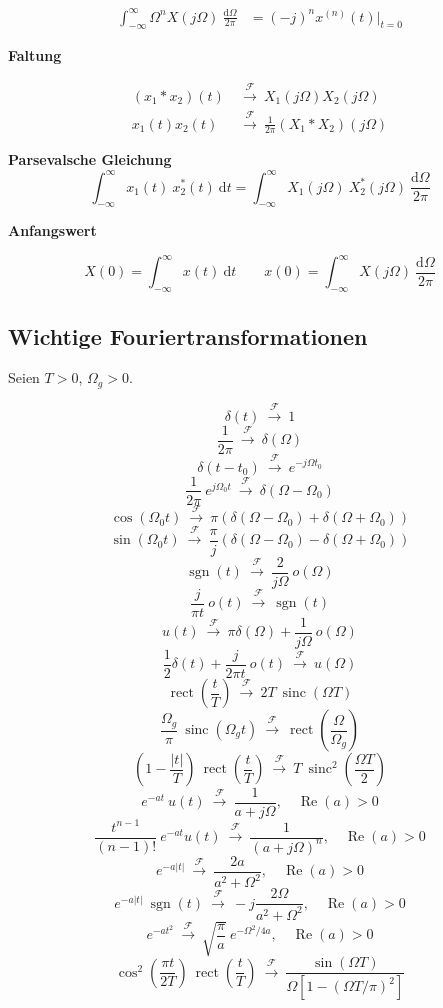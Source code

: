 \documentclass[10pt,a4paper]{article}
\newcommand{\fancyformula}[2]{
	\small
	\raggedright\sffamily\textbf{#1}
	#2
}
\newcommand{\ftransform}{
	~\xrightarrow{~\mathcal{F}~}~
}
\DeclareMathOperator{\sinc}{sinc}
\DeclareMathOperator{\sgn}{sgn}
\DeclareMathOperator{\rect}{rect}
\renewcommand{\Re}{\operatorname{Re}}
\begin{document}
\begin{multicols}{2}
{\begin{align*}
	\int_{-\infty}^{\infty}\Omega^n X(j\Omega) ~ \frac{\mathrm d\Omega}{2\pi}&=(-j)^n x^{(n)}(t) \bigg|_{t=0}
\end{align*}	
}
\fancyformula{Faltung}{
\begin{align*}
	(x_1 \ast x_2)(t) &\ftransform X_1(j\Omega)X_2(j\Omega)\\
	x_1(t)x_2(t) &\ftransform \frac{1}{2\pi} (X_1 \ast X_2)(j\Omega)
\end{align*}
}
\fancyformula{Parsevalsche Gleichung}{\[ \int_{-\infty}^{\infty} x_1(t) ~ x_2^*(t) ~ \mathrm dt = \int_{-\infty}^{\infty}X_1(j\Omega) ~ X_2^*(j\Omega) ~ \frac{\mathrm d\Omega}{2\pi} \]}

\fancyformula{Anfangswert}{
	\[ X(0) = \int_{-\infty}^{\infty} x(t) ~ \mathrm dt \qquad x(0)=\int_{-\infty}^{\infty} X(j\Omega) ~ \frac{\mathrm d\Omega}{2\pi} \]	
}
\end{multicols}
\newpage

\subsection*{Wichtige Fouriertransformationen}
Seien $T>0$, $\Omega_g>0$.
\begin{multicols}{2}
	\small
	\[ \delta(t) \ftransform 1 \]
	\[ \frac{1}{2 \pi} \ftransform \delta(\Omega) \]
	\[ \delta(t - t_0) \ftransform e^{-j\Omega t_0} \]
	\[ \frac{1}{2 \pi} ~ e^{j \Omega_0 t} \ftransform \delta(\Omega - \Omega_0) \]
	\[ \cos(\Omega_0 t) \ftransform \pi \left( \delta(\Omega - \Omega_0) + \delta(\Omega + \Omega_0) \right) \]
	\[ \sin(\Omega_0 t) \ftransform \frac{\pi}{j} \left( \delta(\Omega - \Omega_0) - \delta(\Omega + \Omega_0) \right) \]
	\[ \sgn(t) \ftransform \frac{2}{j \Omega} ~ o(\Omega) \]
	\[ \frac{j}{\pi t} ~ o(t) \ftransform \sgn(t) \]
	\[ u(t) \ftransform \pi \delta(\Omega) + \frac{1}{j \Omega} ~ o(\Omega) \]
	\[ \frac{1}{2} \delta(t) + \frac{j}{2 \pi t} ~ o(t) \ftransform u(\Omega) \]
	\[ \rect \left(\frac{t}{T} \right) \ftransform 2 T ~ \sinc(\Omega T) \]
	\[ \frac{\Omega_g}{\pi} ~ \sinc(\Omega_g t) \ftransform \rect \left( \frac{\Omega}{\Omega_g} \right) \]
	\[ \left(1 - \frac{|t|}{T} \right) ~ \rect \left(\frac{t}{T} \right) \ftransform T ~ \sinc^2 \left( \frac{\Omega T}{2} \right) \]
	\[ e^{-at} ~ u(t) \ftransform \frac{1}{a+j\Omega},\quad \Re(a)>0 \]
	\[ \frac{t^{n-1}}{(n-1)!} ~ e^{-at}u(t) \ftransform \frac{1}{(a+j\Omega)^n},\quad \Re(a)>0 \]
	\[ e^{-a\lvert t \rvert} \ftransform \frac{2a}{a^2+\Omega^2},\quad \Re(a)>0\]
	\[ e^{-a\lvert t \rvert} ~ \sgn(t) \ftransform -j\frac{2\Omega}{a^2+\Omega^2},\quad \Re(a)>0 \]
	\[ e^{-at^2} \ftransform \sqrt{\frac{\pi}{a}}~e^{-\Omega^2/4a},\quad \Re(a)>0 \]
	\[ \cos^2\left(\frac{\pi t}{2T}\right)~\rect\left(\frac{t}{T}\right) \ftransform \frac{\sin(\Omega T)}{\Omega[1-(\Omega T/\pi)^2]} \]
\end{multicols}
\end{document}
